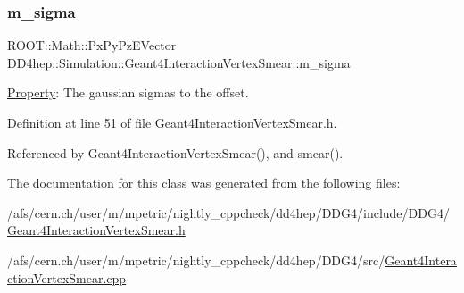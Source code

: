 \subsubsection{\texorpdfstring{m\+\_\+sigma}{m\_sigma}}
{\footnotesize\ttfamily R\+O\+O\+T\+::\+Math\+::\+Px\+Py\+Pz\+E\+Vector D\+D4hep\+::\+Simulation\+::\+Geant4\+Interaction\+Vertex\+Smear\+::m\+\_\+sigma\hspace{0.3cm}{\ttfamily [protected]}}



\hyperlink{class_d_d4hep_1_1_property}{Property}\+: The gaussian sigmas to the offset. 



Definition at line 51 of file Geant4\+Interaction\+Vertex\+Smear.\+h.



Referenced by Geant4\+Interaction\+Vertex\+Smear(), and smear().



The documentation for this class was generated from the following files\+:\begin{DoxyCompactItemize}
\item 
/afs/cern.\+ch/user/m/mpetric/nightly\+\_\+cppcheck/dd4hep/\+D\+D\+G4/include/\+D\+D\+G4/\hyperlink{_geant4_interaction_vertex_smear_8h}{Geant4\+Interaction\+Vertex\+Smear.\+h}\item 
/afs/cern.\+ch/user/m/mpetric/nightly\+\_\+cppcheck/dd4hep/\+D\+D\+G4/src/\hyperlink{_geant4_interaction_vertex_smear_8cpp}{Geant4\+Interaction\+Vertex\+Smear.\+cpp}\end{DoxyCompactItemize}
